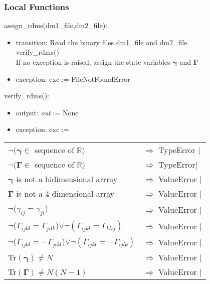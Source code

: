 \documentclass[12pt, titlepage]{article}
\begin{document}
\subsubsection{Local Functions}

\noindent assign\_rdms(dm1\_file,dm2\_file):
\begin{itemize}
	\item transition: Read the binary files dm1\_file and 
	dm2\_file.\\
	verify\_rdms()\\
	If no exception is raised, assign the state variables $\boldsymbol{\gamma}$ 
	and $\boldsymbol{\Gamma}$	
	\item exception: exc := FileNotFoundError
\end{itemize}

\noindent verify\_rdms():
\begin{itemize}
	\item output: \textit{out} := None
	\item exception: exc := 
\end{itemize}
\noindent \begin{longtable*}[l]{l l}
	$\neg(\boldsymbol{\gamma}\in$ sequence of $\mathbb{R})$ & $\Rightarrow$ 
	TypeError $\vert$\\
	$\neg(\boldsymbol{\Gamma}\in$ sequence of $\mathbb{R})$ & $\Rightarrow$ 
	TypeError$ \vert$\\
	$\boldsymbol{\gamma}$ is not a bidimensional arrray  & $\Rightarrow$ 
	ValueError $\vert$\\
	$\boldsymbol{\Gamma}$ is not a 4 dimensional array& $\Rightarrow$ 
	ValueError $\vert$\\
	$\neg$($\gamma_{ij} = \gamma_{ji}$) & $\Rightarrow$ 
	ValueError $\vert$\\
	$\neg$($\Gamma_{ijkl} = \Gamma_{jilk}$)$\lor \neg(\Gamma_{ijkl} = 
	\Gamma_{klij})$ & 
	$\Rightarrow$ 
	ValueError $\vert$\\
	$\neg$($\Gamma_{ijkl} = -\Gamma_{jikl}$)$\lor \neg(\Gamma_{ijkl} = 
	-\Gamma_{ijlk})$ & 
	$\Rightarrow$ 
	ValueError $\vert$\\
	Tr$(\boldsymbol{\gamma}) \neq N$ & $\Rightarrow$ 
	ValueError $\vert$\\
	Tr$(\boldsymbol{\Gamma}) \neq N(N-1)$ & $\Rightarrow$ 
	ValueError $\vert$\\
\end{longtable*}
\end{document}
